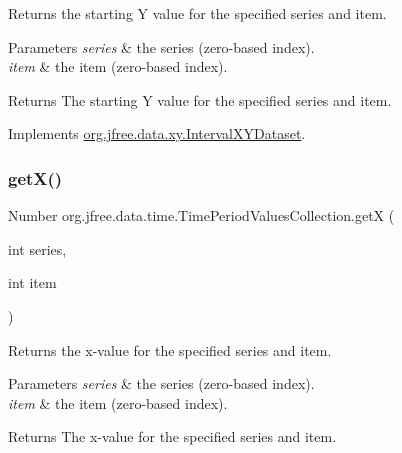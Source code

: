 Returns the starting Y value for the specified series and item.


\begin{DoxyParams}{Parameters}
{\em series} & the series (zero-\/based index). \\
\hline
{\em item} & the item (zero-\/based index).\\
\hline
\end{DoxyParams}
\begin{DoxyReturn}{Returns}
The starting Y value for the specified series and item. 
\end{DoxyReturn}


Implements \mbox{\hyperlink{interfaceorg_1_1jfree_1_1data_1_1xy_1_1_interval_x_y_dataset_afdd414735adb233734bc35b76a005ed9}{org.\+jfree.\+data.\+xy.\+Interval\+X\+Y\+Dataset}}.

\mbox{\label{classorg_1_1jfree_1_1data_1_1time_1_1_time_period_values_collection_ac857f32843f8ae8ed8e27d15fd313606}} 
\subsubsection{\texorpdfstring{get\+X()}{getX()}}
{\footnotesize\ttfamily Number org.\+jfree.\+data.\+time.\+Time\+Period\+Values\+Collection.\+getX (\begin{DoxyParamCaption}\item[{int}]{series,  }\item[{int}]{item }\end{DoxyParamCaption})}

Returns the x-\/value for the specified series and item.


\begin{DoxyParams}{Parameters}
{\em series} & the series (zero-\/based index). \\
\hline
{\em item} & the item (zero-\/based index).\\
\hline
\end{DoxyParams}
\begin{DoxyReturn}{Returns}
The x-\/value for the specified series and item. 
\end{DoxyReturn}


